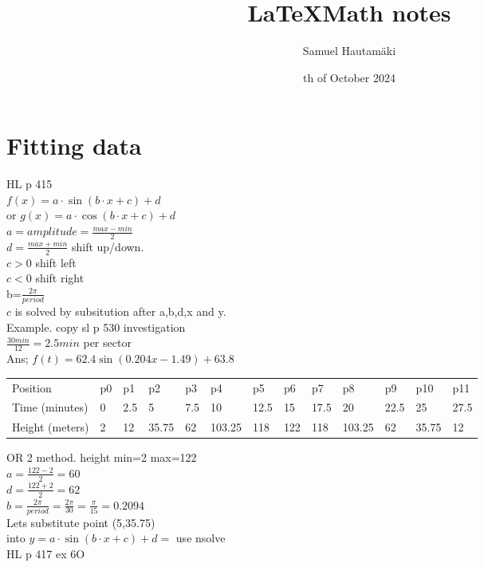 \documentclass{article}
\title{\LaTeX Math notes}
\author{Samuel Hautamäki}
\date{th of October 2024}
\begin{document}
  \maketitle
   
  \section{Fitting data}
  HL p 415\\
  $f(x)=a\cdot\sin(b\cdot x+c)+d$\\
  or $g(x)=a\cdot\cos(b\cdot x+c)+d$\\
  $a=amplitude=\frac{max-min}{2}$\\
  $d=\frac{max+min}{2}$ shift up/down.\\
  $c>0$ shift left\\
  $c<0$ shift right\\
  b=$\frac{2\pi}{period}$\\
  $c$ is solved by subsitution after a,b,d,x and y.\\
  Example. copy sl p 530 investigation\\
  $\frac{30min}{12}=2.5min$ per sector\\
  Ans; $f(t)=62.4\sin(0.204x-1.49)+63.8$\\

  \begin{table}[]
  \begin{tabular}{lllllllllllll}
  Position        & p0 & p1  & p2    & p3  & p4     & p5   & p6  & p7   & p8     & p9   & p10   & p11  \\
  Time (minutes)  & 0  & 2.5 & 5     & 7.5 & 10     & 12.5 & 15  & 17.5 & 20     & 22.5 & 25    & 27.5 \\
  Height (meters) & 2  & 12  & 35.75 & 62  & 103.25 & 118  & 122 & 118  & 103.25 & 62   & 35.75 & 12  
  \end{tabular}
  \end{table}
  OR 2 method.
  height min=2 max=122\\
  $a=\frac{122-2}{2}=60$\\
  $d=\frac{122+2}{2}=62$\\
  $b=\frac{2\pi}{period}=\frac{2\pi}{30}=\frac{\pi}{15}=0.2094$\\
  Lets substitute point (5,35.75)\\
  into $y=a\cdot\sin(b\cdot x+c)+d=$ use nsolve\\
  HL p 417 ex 6O\\
\end{document}
